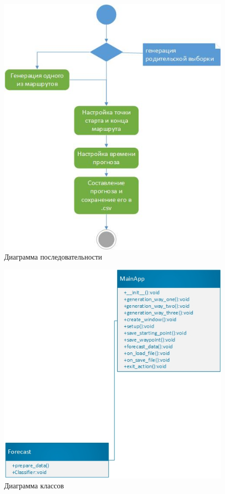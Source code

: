 \documentclass[a4paper,english]{G2-105}
\begin{document}
	\begin{figure}
		\includegraphics[width  = \linewidth]{gradulation_activity_second.jpg}
		\caption{Диаграмма последовательности}\label{sequence}
	\end{figure}
	
	\begin{figure}
		\includegraphics[width  = \linewidth]{gradulation_class_pic.jpg}
		\caption{Диаграмма классов}\label{class}
	\end{figure}
	
\end{document}
